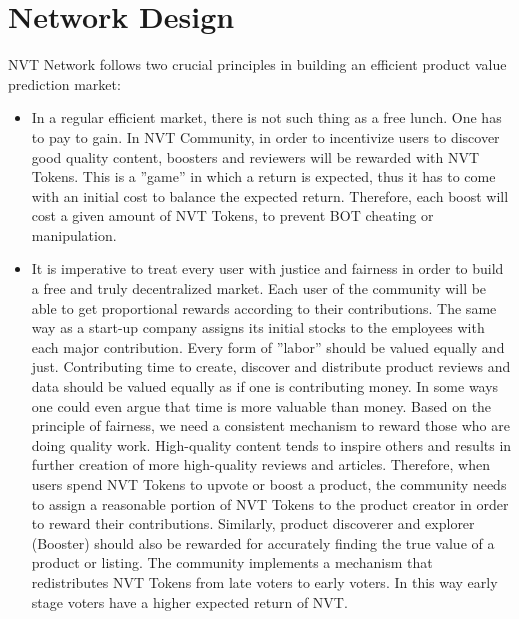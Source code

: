 
\chapter{Network Design} %

\label{Chapter3} %

NVT Network follows two crucial principles in building an efficient product value prediction market:

\begin{itemize}
\item In a regular efficient market, there is not such thing as a free lunch. One has to pay to gain. In NVT Community, in order to incentivize users to discover good quality content, boosters and reviewers will be rewarded with NVT Tokens. This is a ”game” in which a return is expected, thus it has to come with an initial cost to balance the expected return. Therefore, each boost will cost a given amount of NVT Tokens, to prevent BOT cheating or manipulation.
\item It is imperative to treat every user with justice and fairness in order to build a free and truly decentralized market. Each user of the community will be able to get proportional rewards according to their contributions. The same way as a start-up company assigns its initial stocks to the employees with each major contribution. Every form of ”labor” should be valued equally and just. Contributing time to create, discover and distribute product reviews and data should be valued equally as if one is contributing money. In some ways one could even argue that time is more valuable than money. Based on the principle of fairness, we need a consistent mechanism to reward those who are doing quality work. High-quality content tends to inspire others and results in further creation of more high-quality reviews and articles. Therefore, when users spend NVT Tokens to upvote or boost a product, the community needs to assign a reasonable portion of NVT Tokens to the product creator in order to reward their contributions. Similarly, product discoverer and explorer (Booster) should also be rewarded for accurately finding the true value of a product or listing. The community implements a mechanism that redistributes NVT Tokens from late voters to early voters. In this way early stage voters have a higher expected return of NVT.
\end{itemize}

